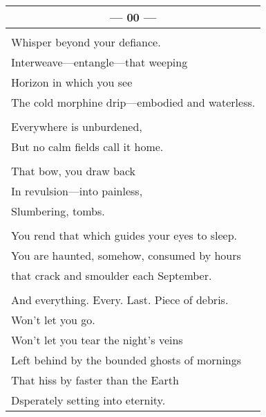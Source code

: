 \documentclass{article}
\begin{document}
\newpage

\begin{center}
\begin{tabular}{l}
\multicolumn{1}{c}{\textbf{--- 00 ---}} \\ \hline
\\
Whisper beyond your defiance. \\
Interweave---entangle---that weeping \\
Horizon in which you see \\
The cold morphine drip---embodied and waterless. \\
\\
Everywhere is unburdened, \\
But no calm fields call it home. \\
\\
That bow, you draw back \\
In revulsion---into painless, \\
Slumbering, tombs. \\ %
\\
You rend that which guides your eyes to sleep. \\
You are haunted, somehow, consumed by hours \\
that crack and smoulder each September. \\
\\
And everything. Every. Last. Piece of debris. \\
Won't let you go. \\
Won't let you tear the night's veins \\
Left behind by the bounded ghosts of mornings \\
That hiss by faster than the Earth \\
Dsperately setting into eternity. \\
\end{tabular}
\end{center}

\newpage
\end{document}
